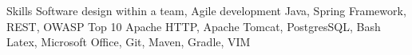\begin{rubric}{Skills}
    Software design within a team, Agile development
    Java, Spring Framework, REST, OWASP Top 10
    Apache HTTP, Apache Tomcat, PostgresSQL, Bash
\entry*[Miscellaneous]
    Latex, Microsoft Office, Git, Maven, Gradle, VIM
\end{rubric}